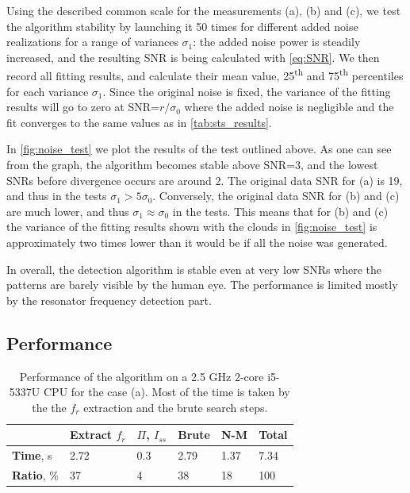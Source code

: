 \documentclass[%
 aip,
 draft,
 amsmath,amssymb,
 reprint,%
]{revtex4-1}
\begin{document}
Using the described common scale for the measurements (a), (b) and (c), we test the algorithm stability by launching it 50 times for different added noise realizations for a range of variances $\sigma_1$: the added noise power is steadily increased, and the resulting SNR is being calculated with \eqref{eq:SNR}. We then record all fitting results, and calculate their mean value, 25\textsuperscript{th} and 75\textsuperscript{th} percentiles for each variance $\sigma_1$.  Since the original noise is fixed, the variance of the fitting results will go to zero at SNR=$ r/\sigma_0 $ where the added noise is negligible and the fit converges to the same values as in \autoref{tab:sts_results}. 

In \autoref{fig:noise_test} we plot the results of the test outlined above. As one can see from the graph, the algorithm becomes stable above SNR=3, and the lowest SNRs before divergence occurs are around 2. The original data SNR for (a) is 19, and thus in the tests $\sigma_1 > 5\sigma_0$. Conversely, the original data SNR for (b) and (c) are much lower, and thus $\sigma_1 \approx \sigma_0$ in the tests. This means that for (b) and (c) the variance of the fitting results shown with the clouds in \autoref{fig:noise_test} is approximately two times lower than it would be if all the noise was generated.

In overall, the detection algorithm is stable even at very low SNRs where the patterns are barely visible by the human eye. The performance is limited mostly by the resonator frequency detection part.


\subsection{Performance}


\begin{table}[b]
	\begin{ruledtabular}
		\begin{tabular}{llllll}
			&Extract $f_r$& $\Pi$, $I_{ss}$ & Brute &N-M &
			\textbf{Total}\\\hline
			\textbf{Time}, s& 2.72& 0.3&2.79&1.37&7.34\\
			\textbf{Ratio}, \% & 37 &4 &38 &18 &100
		\end{tabular}
	\end{ruledtabular}
	\caption{Performance of the algorithm on a 2.5 GHz 2-core i5-5337U CPU for the case (a). Most of the time is taken by the the $f_r$ extraction and the brute search steps.}
	\label{tab:performance}
\end{table}
\end{document}
